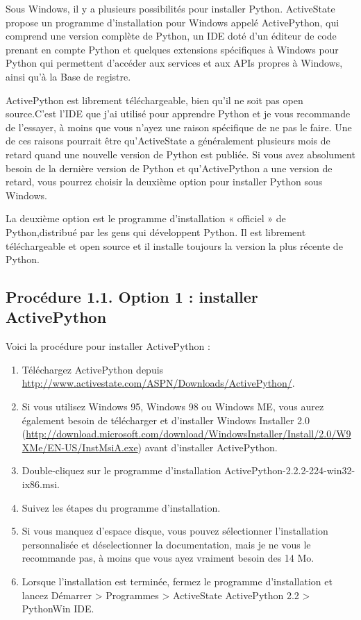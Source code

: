 Sous Windows, il y a plusieurs possibilités pour installer Python. ActiveState propose un programme d'installation pour Windows appelé ActivePython, qui comprend une version complète de Python, un IDE doté d'un éditeur de code prenant en compte Python et quelques extensions spécifiques à Windows pour Python qui permettent d'accéder aux services et aux APIs propres à Windows, ainsi qu'à la Base de registre.

ActivePython est librement téléchargeable, bien qu'il ne soit pas open source.C'est l'IDE que j'ai utilisé pour apprendre Python et je vous recommande de l'essayer, à moins que vous n'ayez une raison spécifique de ne pas le faire. Une de ces raisons pourrait être qu'ActiveState a généralement plusieurs mois de retard quand une nouvelle version de Python est publiée. Si vous avez absolument besoin de la dernière version de Python et qu'ActivePython a une version de retard, vous pourrez choisir la deuxième option pour installer Python sous Windows.

La deuxième option est le programme d'installation « officiel » de Python,distribué par les gens qui développent Python. Il est librement téléchargeable et open source et il installe toujours la version la plus récente de Python.

\subsection*{Procédure 1.1. Option 1 : installer ActivePython}

Voici la procédure pour installer ActivePython :

\begin{enumerate}
    \item{Téléchargez ActivePython depuis \url{http://www.activestate.com/ASPN/Downloads/ActivePython/}.}
    \item{Si vous utilisez Windows 95, Windows 98 ou Windows ME, vous aurez également besoin de télécharger et d'installer Windows Installer 2.0 (\url{http://download.microsoft.com/download/WindowsInstaller/Install/2.0/W9XMe/EN-US/InstMsiA.exe}) avant d'installer ActivePython.}
    \item{Double-cliquez sur le programme d'installation ActivePython-2.2.2-224-win32-ix86.msi.}
    \item{Suivez les étapes du programme d'installation.}
    \item{Si vous manquez d'espace disque, vous pouvez sélectionner l'installation personnalisée et déselectionner la documentation, mais je ne vous le recommande pas, à moins que vous ayez vraiment besoin des 14 Mo.}
    \item{Lorsque l'installation est terminée, fermez le programme d'installation et lancez Démarrer > Programmes > ActiveState ActivePython 2.2 > PythonWin IDE.}
\end{enumerate}

